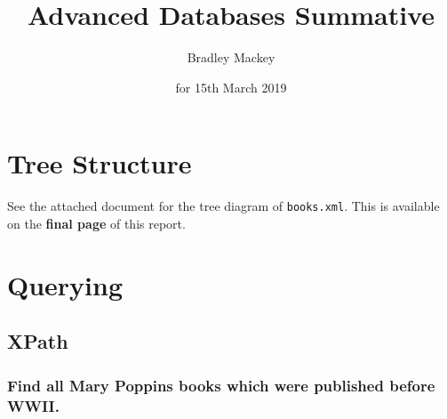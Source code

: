 \documentclass[11pt]{article}
\begin{document}
\title{\textbf{Advanced Databases Summative}}
\date{for 15th March 2019}
\author{Bradley Mackey}
\maketitle

\section{Tree Structure}

See the attached document for the tree diagram of \texttt{books.xml}. This is available on the \textbf{final page} of this report.

\section{Querying}

\subsection{XPath}

\subsubsection{Find all Mary Poppins books which were published before WWII.}
\end{document}
